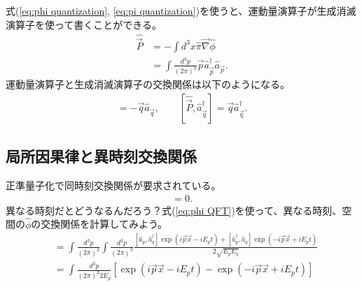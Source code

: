 \documentclass[10pt,a4paper]{jarticle}
\begin{document}
式(\ref{eq:phi quantization}, \ref{eq:pi quantization})を使うと、運動量演算子が生成消滅演算子を使って書くことができる。
\begin{align}
\hat{\vec P}
&= -\int d^3x \hat \pi \vec \nabla \hat \phi \nonumber\\
%
%
%
%
&= \int \frac{d^3 p}{(2\pi)^3} \vec p \hat a_{\vec p}^\dagger \hat a_{\vec p}.
\end{align}
%
運動量演算子と生成消滅演算子の交換関係は以下のようになる。
\begin{align}
[\hat{\vec P}, \hat a_{\vec q}] = -\vec q \hat a_{\vec q}, \qquad
[\hat{\vec P}, \hat a_{\vec q}^\dagger] = \vec q \hat a_{\vec q}^\dagger.
\end{align}





\subsection{局所因果律と異時刻交換関係}
正準量子化で同時刻交換関係が要求されている。
\begin{align}
[\hat \phi(t,\vec x), \hat \phi(t,\vec y)]  = 0.
\end{align}
異なる時刻だとどうなるんだろう？式(\ref{eq:phi QFT})を使って、異なる時刻、空間の$\hat\phi$の交換関係を計算してみよう。
\begin{align}
[\hat\phi(t,\vec x), \hat\phi(0,\vec 0)]
&=
\int \frac{d^3 p}{(2\pi)^3}
\int \frac{d^3 p}{(2\pi)^3}
\frac{ [\hat a_p, \hat a_q^\dagger] \exp\left( i\vec p \vec x - i E_p t  \right)
+ [\hat a_p^\dagger, \hat a_q] \exp\left( -i\vec p \vec x + i E_p t  \right)
}{2\sqrt{E_pE_q}} \nonumber\\
&=
\int \frac{d^3 p}{(2\pi)^3 2E_p}
\left[ \exp\left( i\vec p \vec x - i E_p t  \right)
- \exp\left( -i\vec p \vec x + i E_p t \right)
\right] \label{eq:commutation relation different time}
\end{align}
\end{document}

